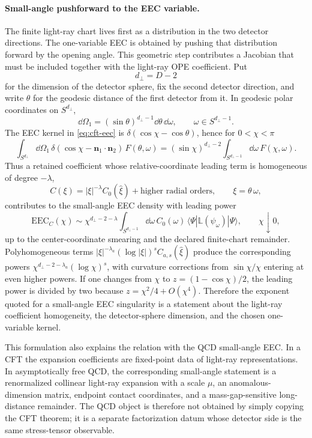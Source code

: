 \paragraph{Small-angle pushforward to the EEC variable.}
The finite light-ray chart lives first as a distribution in the two detector
directions.  The one-variable EEC is obtained by pushing that distribution
forward by the opening angle.  This geometric step contributes a Jacobian that
must be included together with the light-ray OPE coefficient.  Put
\[
  d_\perp=D-2
\]
for the dimension of the detector sphere, fix the second detector direction,
and write \(\theta\) for the geodesic distance of the first detector from it.
In geodesic polar coordinates on \(S^{d_\perp}\),
\[
  \dd\Omega_1=(\sin\theta)^{d_\perp-1}\dd\theta\,\dd\omega,
  \qquad \omega\in S^{d_\perp-1}.
\]
The EEC kernel in \eqref{eq:cft-eec} is
\(\delta(\cos\chi-\cos\theta)\), hence for \(0<\chi<\pi\)
\begin{equation}
  \int_{S^{d_\perp}}\dd\Omega_1\,
  \delta(\cos\chi-\mathbf n_1\cdot\mathbf n_2)\,
  F(\theta,\omega)
  =
  (\sin\chi)^{d_\perp-2}
  \int_{S^{d_\perp-1}}\dd\omega\,F(\chi,\omega).
  \label{eq:cft-eec-small-angle-pushforward}
\end{equation}
Thus a retained coefficient whose relative-coordinate leading term is
homogeneous of degree \(-\lambda\),
\[
  C(\xi)=|\xi|^{-\lambda}C_0(\widehat\xi)+\text{higher radial orders},
  \qquad \xi=\theta\,\omega ,
\]
contributes to the small-angle EEC density with leading power
\begin{equation}
  \mathrm{EEC}_C(\chi)
  \sim
  \chi^{d_\perp-2-\lambda}
  \int_{S^{d_\perp-1}}\dd\omega\,C_0(\omega)\,
  \langle\Psi|\mathbb L(\psi_\omega)|\Psi\rangle ,
  \qquad \chi\downarrow0,
  \label{eq:cft-eec-small-angle-homogeneous-power}
\end{equation}
up to the center-coordinate smearing and the declared finite-chart remainder.
Polyhomogeneous terms
\(|\xi|^{-\lambda_a}(\log|\xi|)^s C_{a,s}(\widehat\xi)\) produce the
corresponding powers
\(\chi^{d_\perp-2-\lambda_a}(\log\chi)^s\), with curvature corrections from
\(\sin\chi/\chi\) entering at even higher powers.  If one changes from
\(\chi\) to \(z=(1-\cos\chi)/2\), the leading power is divided by two because
\(z=\chi^2/4+O(\chi^4)\).  Therefore the exponent quoted for a small-angle
EEC singularity is a statement about the light-ray coefficient homogeneity,
the detector-sphere dimension, and the chosen one-variable kernel.

This formulation also explains the relation with the QCD small-angle EEC.
In a CFT the expansion coefficients are fixed-point data of light-ray
representations.  In asymptotically free QCD, the corresponding small-angle
statement is a renormalized collinear light-ray expansion with a scale
\(\mu\), an anomalous-dimension matrix, endpoint contact coordinates, and a
mass-gap-sensitive long-distance remainder.  The QCD object is therefore not
obtained by simply copying the CFT theorem; it is a separate factorization
datum whose detector side is the same stress-tensor observable.

